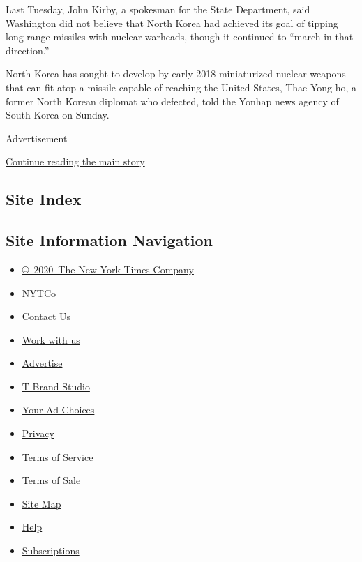 Last Tuesday, John Kirby, a spokesman for the State Department, said
Washington did not believe that North Korea had achieved its goal of
tipping long-range missiles with nuclear warheads, though it continued
to ``march in that direction.''

North Korea has sought to develop by early 2018 miniaturized nuclear
weapons that can fit atop a missile capable of reaching the United
States, Thae Yong-ho, a former North Korean diplomat who defected, told
the Yonhap news agency of South Korea on Sunday.

Advertisement

\protect\hyperlink{after-bottom}{Continue reading the main story}

\hypertarget{site-index}{%
\subsection{Site Index}\label{site-index}}

\hypertarget{site-information-navigation}{%
\subsection{Site Information
Navigation}\label{site-information-navigation}}

\begin{itemize}
\tightlist
\item
  \href{https://help.nytimes.com/hc/en-us/articles/115014792127-Copyright-notice}{©~2020~The
  New York Times Company}
\end{itemize}

\begin{itemize}
\tightlist
\item
  \href{https://www.nytco.com/}{NYTCo}
\item
  \href{https://help.nytimes.com/hc/en-us/articles/115015385887-Contact-Us}{Contact
  Us}
\item
  \href{https://www.nytco.com/careers/}{Work with us}
\item
  \href{https://nytmediakit.com/}{Advertise}
\item
  \href{http://www.tbrandstudio.com/}{T Brand Studio}
\item
  \href{https://www.nytimes.com/privacy/cookie-policy\#how-do-i-manage-trackers}{Your
  Ad Choices}
\item
  \href{https://www.nytimes.com/privacy}{Privacy}
\item
  \href{https://help.nytimes.com/hc/en-us/articles/115014893428-Terms-of-service}{Terms
  of Service}
\item
  \href{https://help.nytimes.com/hc/en-us/articles/115014893968-Terms-of-sale}{Terms
  of Sale}
\item
  \href{https://spiderbites.nytimes.com}{Site Map}
\item
  \href{https://help.nytimes.com/hc/en-us}{Help}
\item
  \href{https://www.nytimes.com/subscription?campaignId=37WXW}{Subscriptions}
\end{itemize}
